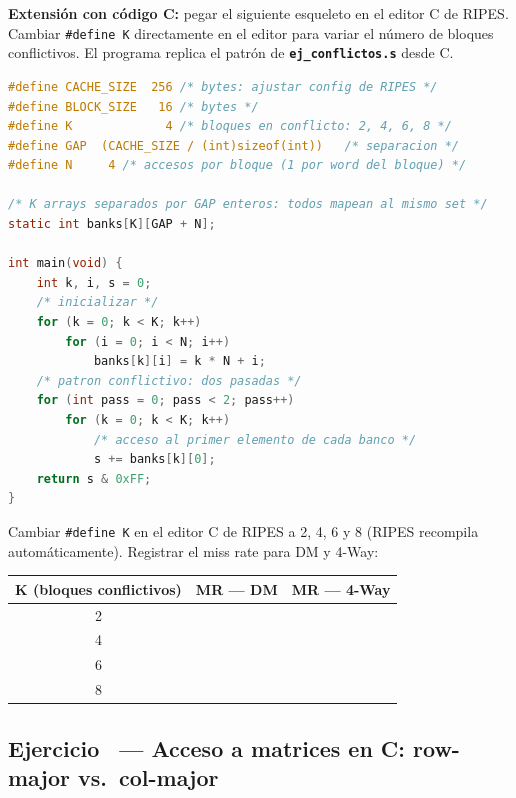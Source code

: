 \documentclass[12pt, a4paper]{article}
\newcommand{\archivo}[1]{\texttt{\textbf{#1}}}
\newcounter{ejnum}
\newcommand{\ejerciciosec}[1]{%
  \stepcounter{ejnum}%
  \subsection{Ejercicio \theejnum\ — #1}%
}
\begin{document}
\vspace{0.4cm}
\textbf{Extensión con código C:} pegar el siguiente esqueleto en el editor C de RIPES.
Cambiar \texttt{\#define K} directamente en el editor para variar el número de bloques
conflictivos. El programa replica el patrón de \archivo{ej\_conflictos.s} desde C.
\newpage
\begin{lstlisting}[language=C, caption={Pegar en editor C de RIPES --- cambiar K = 2, 4, 6, 8}]
#define CACHE_SIZE  256 /* bytes: ajustar config de RIPES */
#define BLOCK_SIZE   16 /* bytes */
#define K             4 /* bloques en conflicto: 2, 4, 6, 8 */
#define GAP  (CACHE_SIZE / (int)sizeof(int))   /* separacion */
#define N     4 /* accesos por bloque (1 por word del bloque) */

/* K arrays separados por GAP enteros: todos mapean al mismo set */
static int banks[K][GAP + N];

int main(void) {
    int k, i, s = 0;
    /* inicializar */
    for (k = 0; k < K; k++)
        for (i = 0; i < N; i++)
            banks[k][i] = k * N + i;
    /* patron conflictivo: dos pasadas */
    for (int pass = 0; pass < 2; pass++)
        for (k = 0; k < K; k++)
            /* acceso al primer elemento de cada banco */
            s += banks[k][0];   
    return s & 0xFF;
}
\end{lstlisting}

Cambiar \texttt{\#define K} en el editor C de RIPES a 2, 4, 6 y 8 (RIPES recompila
automáticamente). Registrar el miss rate para DM y 4-Way:

\begin{center}
\renewcommand{\arraystretch}{1.8}
\begin{tabular}{|c|c|c|}
    \hline
    \textbf{K (bloques conflictivos)} & \textbf{MR — DM} & \textbf{MR — 4-Way} \\
    \hline
    2 & & \\
    \hline
    4 & & \\
    \hline
    6 & & \\
    \hline
    8 & & \\
    \hline
\end{tabular}
\end{center}


\newpage

\ejerciciosec{Acceso a matrices en C: row-major vs.\ col-major}
\end{document}
